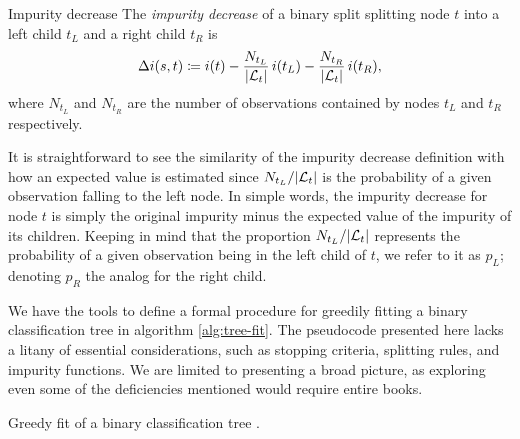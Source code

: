 \begin{dfn}{Impurity decrease}{}
    The \emph{impurity decrease} of a binary split splitting node $t$ into a
    left child $t_L$ and a right child $t_R$ is
    \begin{equation*}
        \Delta i(s, t) \coloneqq i(t) - \frac{N_{t_L}}{|\mathcal{L}_t|} \, i(t_L) - \frac{N_{t_R}}{|\mathcal{L}_t|} \, i(t_R),
    \end{equation*}
    where $N_{t_L}$ and $N_{t_R}$ are the number of observations contained by
    nodes $t_L$ and $t_R$ respectively.
\end{dfn}

It is straightforward to see the similarity of the impurity decrease definition
with how an expected value is estimated since $N_{t_L} / |\mathcal{L}_t|$ is the
probability of a given observation falling to the left node. In simple words,
the impurity decrease for node $t$ is simply the original impurity minus the
expected value of the impurity of its children. Keeping in mind that the
proportion $N_{t_L} / |\mathcal{L}_t|$ represents the probability of a given observation
being in the left child of $t$, we refer to it as $p_L$; denoting $p_R$ the
analog for the right child.

We have the tools to define a formal procedure for greedily fitting a binary
classification tree in algorithm \ref{alg:tree-fit}. The pseudocode presented
here lacks a litany of essential considerations, such as stopping criteria,
splitting rules, and impurity functions. We are limited to presenting a broad
picture, as exploring even some of the deficiencies mentioned would require
entire books.

\begin{algorithm}
    \caption{Greedy fit of a binary classification tree
        \cite[Ch.~3.3]{louppe2014}.}
    \label{alg:tree-fit}
\end{algorithm}

